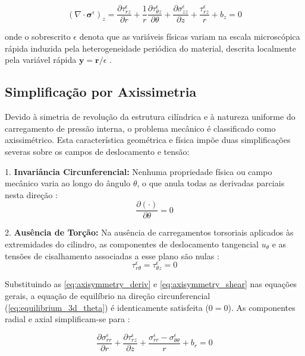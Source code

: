 \begin{equation}
  (\nabla \cdot \boldsymbol{\sigma}^\epsilon)_z = \frac{\partial \tau_{rz}^\epsilon}{\partial r} + \frac{1}{r} \frac{\partial \tau_{\theta z}^\epsilon}{\partial \theta} + \frac{\partial \sigma_{zz}^\epsilon}{\partial z} + \frac{\tau_{rz}^\epsilon}{r} + b_z = 0
  \label{eq:equilibrium_3d_z}
\end{equation}

onde o sobrescrito $\epsilon$ denota que as variáveis físicas variam na escala microscópica rápida induzida pela heterogeneidade periódica do material, descrita localmente pela variável rápida $\mathbf{y} = \mathbf{r}/\epsilon$  \cite{bakhvalov1989}.

\subsection{Simplificação por Axissimetria}

Devido à simetria de revolução da estrutura cilíndrica e à natureza uniforme do carregamento de pressão interna, o problema mecânico é classificado como axissimétrico. Esta característica geométrica e física impõe duas simplificações severas sobre os campos de deslocamento e tensão:

1. \textbf{Invariância Circunferencial:} Nenhuma propriedade física ou campo mecânico varia ao longo do ângulo $\theta$, o que anula todas as derivadas parciais nesta direção \cite{Sadd2009}:
\begin{equation}
  \frac{\partial(\cdot)}{\partial \theta} = 0
  \label{eq:axisymmetry_deriv}
\end{equation}

2. \textbf{Ausência de Torção:} Na ausência de carregamentos torsoriais aplicados às extremidades do cilindro, as componentes de deslocamento tangencial $u_\theta$ e as tensões de cisalhamento associadas a esse plano são nulas \cite{Sadd2009}:
\begin{equation}
  \tau_{r\theta}^\epsilon = \tau_{\theta z}^\epsilon = 0
  \label{eq:axisymmetry_shear}
\end{equation}

Substituindo as \eqref{eq:axisymmetry_deriv} e \eqref{eq:axisymmetry_shear} nas equações gerais, a equação de equilíbrio na direção circunferencial (\eqref{eq:equilibrium_3d_theta}) é identicamente satisfeita ($0 = 0$). As componentes radial e axial simplificam-se para \cite{Timoshenko_1951}:

\begin{equation}
  \frac{\partial \sigma_{rr}^\epsilon}{\partial r} + \frac{\partial \tau_{rz}^\epsilon}{\partial z} + \frac{\sigma_{rr}^\epsilon - \sigma_{\theta\theta}^\epsilon}{r} + b_r = 0
  \label{eq:equilibrium_axi_r}
\end{equation}

